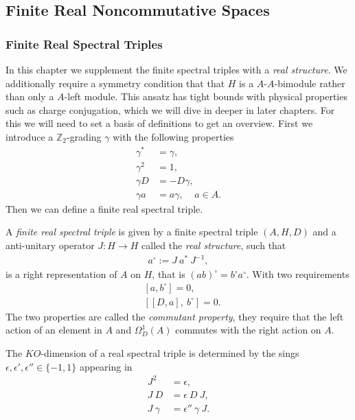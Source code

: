 \subsection{Finite Real Noncommutative Spaces}
\subsubsection{Finite Real Spectral Triples}
In this chapter we supplement the finite spectral triples with a \textit{real
structure}. We additionally require a symmetry condition that that $H$ is a
$A$-$A$-bimodule rather than only a $A$-left module. This ansatz has tight
bounds with physical properties such as charge conjugation, which we will
dive in deeper in later chapters. For this we will need to set a basis
of definitions to get an overview.
First we introduce a $\mathbb{Z}_2$-grading $\gamma$ with the following
properties
\begin{align}
    \gamma ^* &= \gamma, \\
    \gamma ^2 &= 1, \\
    \gamma D &= - D \gamma,\\
    \gamma a &= a \gamma, \;\;\;\; a\in A.
\end{align}
Then we can define a finite real spectral triple.
\begin{definition}
    A \textit{finite real spectral triple} is given by a finite spectral
    triple $(A, H, D)$ and a anti-unitary operator $J:H\rightarrow H$ called
    the \textit{real structure}, such that
    \begin{align}
        a^\circ := J\ a^*\ J^{-1},
    \end{align}
    is a right representation of $A$ on $H$, that is $(ab)^\circ = b^\circ
    a^\circ$. With two requirements
    \begin{align}
        &[a, b^\circ] = 0,\\
        &[[D, a],\ b^\circ] = 0.
    \end{align}
    The two properties are called the \textit{commutant property}, they
    require that the left action of an element in $A$ and $\Omega _D^1(A)$ commutes with the right
    action on $A$.
\end{definition}
\begin{definition}
    The $KO$-dimension of a real spectral triple is determined by the sings
    $\epsilon, \epsilon ' ,\epsilon '' \in \{-1, 1\}$ appearing in
    \begin{align}
        J^2 &= \epsilon, \\
        J\ D &= \epsilon \ D\ J,\\
        J\ \gamma &= \epsilon''\ \gamma\ J.
    \end{align}
\end{definition}
